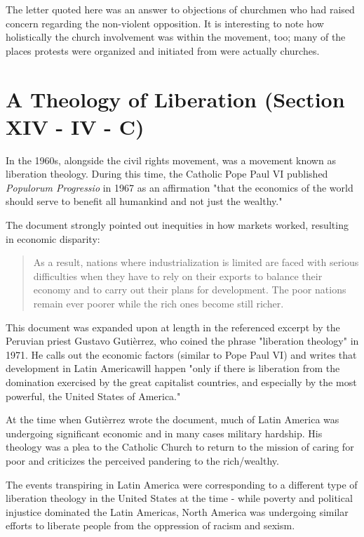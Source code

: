 \documentclass[12pt]{turabian-researchpaper}
\begin{document}
The letter quoted here was an answer to objections of churchmen who had raised concern regarding the non-violent opposition.\autocite[pg.360]{bettenson2011documents}  It is interesting to note how holistically the church involvement was within the movement, too; many of the places protests were organized and initiated from were actually churches.\autocite{wiki:Birmingham}

\section{A Theology of Liberation (Section XIV - IV - C)}

In the 1960s, alongside the civil rights movement, was a movement known as liberation theology. During this time, the Catholic Pope Paul VI published \textit{Populorum Progressio} in 1967 as an affirmation "that the economics of the world should serve to benefit all humankind and not just the wealthy."\autocite[pg.775]{woodbridge2013}

The document strongly pointed out inequities in how markets worked, resulting in economic disparity:\autocite[pg.364]{bettenson2011documents}

\begin{quote}
As a result, nations where industrialization is limited are faced with serious difficulties when they have to rely on their exports to balance their economy and to carry out their plans for development. The poor nations remain ever poorer while the rich ones become still richer.
\end{quote}

This document was expanded upon at length in the referenced excerpt by the Peruvian priest Gustavo Guti\`{e}rrez, who coined the phrase  "liberation theology" in 1971.\autocite[pg.733]{woodbridge2013} He calls out the economic factors (similar to Pope Paul VI) and writes that development in Latin Americawill happen "only if there is liberation from the domination exercised by the great capitalist countries, and especially by the most powerful, the United States of America."\autocite[pg.368]{bettenson2011documents} 

At the time when Guti\`{e}rrez wrote the document, much of Latin America was undergoing significant economic and in many cases military hardship. His theology was a plea to the Catholic Church to return to the mission of caring for poor and criticizes the perceived pandering to the rich/wealthy.\autocite[pg.734]{woodbridge2013} 

The events transpiring in Latin America were corresponding to a different type of liberation theology in the United States at the time - while poverty and political injustice dominated the Latin Americas, North America was undergoing similar efforts to liberate people from the oppression of racism and sexism.\autocite[pg.733]{woodbridge2013} 
\newpage
\printbibliography
\end{document}
